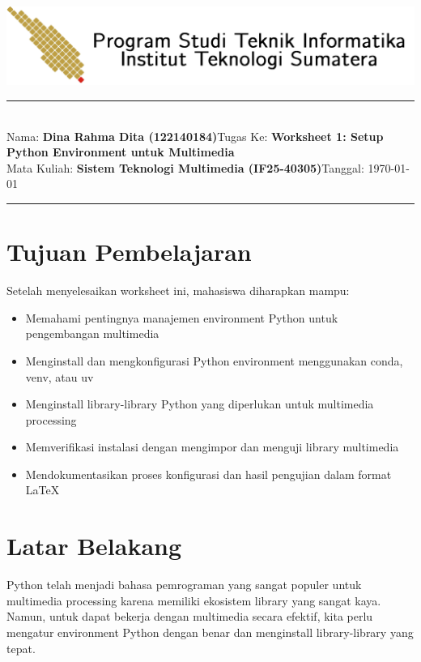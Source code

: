\documentclass[11pt,a4paper]{article}
\newcommand{\student}{\textbf{Dina Rahma Dita (122140184)}}
\newcommand{\course}{\textbf{Sistem Teknologi Multimedia (IF25-40305)}}
\newcommand{\assignment}{\textbf{Worksheet 1: Setup Python Environment untuk Multimedia}}
\begin{document}
\thispagestyle{empty}
\begin{center}
	\includegraphics[scale = 0.15]{Figure/ifitera-header.png}
	\vspace{0.1cm}
\end{center}
\noindent
\rule{17cm}{0.2cm}\\[0.3cm]
Nama: \student \hfill Tugas Ke: \assignment\\[0.1cm]
Mata Kuliah: \course \hfill Tanggal: \today\\
\rule{17cm}{0.05cm}
\vspace{0.1cm}



\section{Tujuan Pembelajaran}
Setelah menyelesaikan worksheet ini, mahasiswa diharapkan mampu:
\begin{itemize}
    \item Memahami pentingnya manajemen environment Python untuk pengembangan multimedia
    \item Menginstall dan mengkonfigurasi Python environment menggunakan conda, venv, atau uv
    \item Menginstall library-library Python yang diperlukan untuk multimedia processing
    \item Memverifikasi instalasi dengan mengimpor dan menguji library multimedia
    \item Mendokumentasikan proses konfigurasi dan hasil pengujian dalam format \LaTeX
\end{itemize}

\section{Latar Belakang}
Python telah menjadi bahasa pemrograman yang sangat populer untuk multimedia processing karena memiliki ekosistem library yang sangat kaya. Namun, untuk dapat bekerja dengan multimedia secara efektif, kita perlu mengatur environment Python dengan benar dan menginstall library-library yang tepat.
\end{document}
